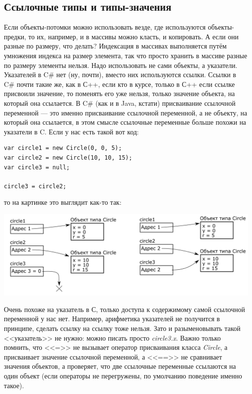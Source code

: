 \documentclass[a5paper]{article}
\begin{document}
\subsection{Ссылочные типы и типы-значения}

Если объекты-потомки можно использовать везде, где используются объекты-предки, то их, например, и в массивы можно класть, и копировать. А если они разные по размеру, что делать? Индексация в массивах выполняется путём умножения индекса на размер элемента, так что просто хранить в массиве разные по размеру элементы нельзя. Надо использовать не сами объекты, а указатели. Указателей в C\# нет (ну, почти), вместо них используются ссылки. Ссылки в C\# почти такие же, как в С++, если кто в курсе, только в С++ если ссылке присвоили значение, то поменять его уже нельзя, только значение объекта, на который она ссылается. В C\# (как и в Java, кстати) присваивание ссылочной переменной --- это именно присваивание ссылочной переменной, а не объекту, на который она ссылается, в этом смысле ссылочные переменные больше похожи на указатели в C. Если у нас есть такой вот код:

\begin{verbatim}
var circle1 = new Circle(0, 0, 5);
var circle2 = new Circle(10, 10, 15);
var circle3 = null;

circle3 = circle2;
\end{verbatim}

то на картинке это выглядит как-то так:

\begin{center}
    \includegraphics[width=\textwidth]{referenceTypes.png}
\end{center}

Очень похоже на указатель в С, только доступа к содержимому самой ссылочной переменной у нас нет. Например, арифметика указателей не получится в принципе, сделать ссылку на ссылку тоже нельзя. Зато и разыменовывать такой <<указатель>> не нужно: можно писать просто \textit{circle3.x}. Важно только помнить, что <<=>> не вызывает оператор присваивания класса \textit{Circle}, а присваивает значение ссылочной переменной, а <<==>> не сравнивает значения объектов, а проверяет, что две ссылочные переменные ссылаются на один объект (если операторы не перегружены, по умолчанию поведение именно такое).
\end{document}
